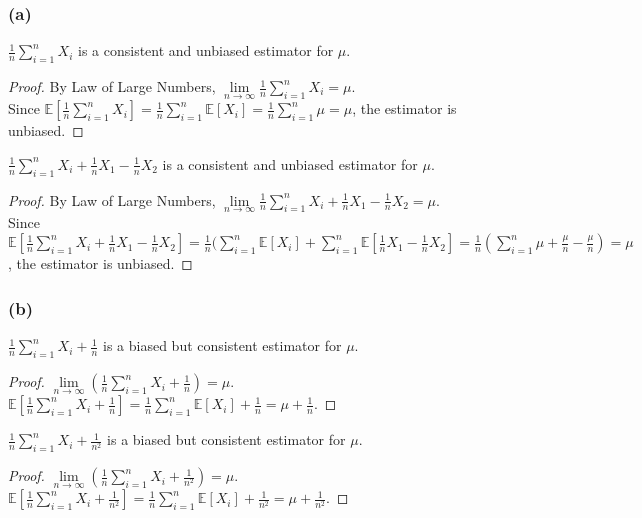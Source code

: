 \documentclass[twoside,11pt]{homework}
\begin{document}
\subsubsection*{(a)}
	\begin{claim}
		$\frac{1}{n} \sum_{i=1}^n X_i $ is a consistent and unbiased estimator for $\mu$.
	\end{claim}
	\begin{proof}
		By Law of Large Numbers, 
		$ \lim\limits_{n\rightarrow \infty} \frac{1}{n} \sum_{i=1}^n X_i = \mu$.\\
		Since $\mathbb{E}[\frac{1}{n} \sum_{i=1}^n X_i]
		=\frac{1}{n} \sum_{i=1}^n \mathbb{E}[X_i]
		=\frac{1}{n} \sum_{i=1}^n \mu
		=\mu
		$, the estimator is unbiased.
	\end{proof}
	\begin{claim}
		$\frac{1}{n} \sum_{i=1}^n X_i + \frac{1}{n} X_1- \frac{1}{n} X_2$ is a consistent and unbiased estimator for $\mu$.
	\end{claim}
	\begin{proof}
		By Law of Large Numbers, 
		$ \lim\limits_{n\rightarrow \infty} \frac{1}{n} \sum_{i=1}^n X_i + \frac{1}{n} X_1- \frac{1}{n} X_2 = \mu$.\\
		Since $\mathbb{E}[\frac{1}{n} \sum_{i=1}^n X_i  + \frac{1}{n} X_1- \frac{1}{n} X_2]
		=\frac{1}{n} (\sum_{i=1}^n \mathbb{E}[X_i] +  \sum_{i=1}^n \mathbb{E}[\frac{1}{n} X_1 - \frac{1}{n} X_2]
		=\frac{1}{n} (\sum_{i=1}^n \mu + \frac{\mu}{n} - \frac{\mu}{n})
		=\mu
		$, the estimator is unbiased.
	\end{proof}

\subsubsection*{(b)}	
	\begin{claim}
		$ \frac{1}{n} \sum_{i=1}^n X_i +\frac{1}{n}$ is a biased but consistent estimator for $\mu$.
	\end{claim}
	\begin{proof}
		$ \lim\limits_{n\rightarrow \infty} (\frac{1}{n} \sum_{i=1}^n X_i +\frac{1}{n})= \mu$.
		$\mathbb{E}[\frac{1}{n} \sum_{i=1}^n X_i +\frac{1}{n}]
		=\frac{1}{n} \sum_{i=1}^n \mathbb{E}[X_i] +\frac{1}{n}
		=\mu+\frac{1}{n}.
		$
	\end{proof}
	\begin{claim}
		$ \frac{1}{n} \sum_{i=1}^n X_i +\frac{1}{n^2}$ is a biased but consistent estimator for $\mu$.
	\end{claim}
	\begin{proof}
		$ \lim\limits_{n\rightarrow \infty} (\frac{1}{n} \sum_{i=1}^n X_i +\frac{1}{n^2	})= \mu$.
		$\mathbb{E}[\frac{1}{n} \sum_{i=1}^n X_i +\frac{1}{n^2}]
		=\frac{1}{n} \sum_{i=1}^n \mathbb{E}[X_i] +\frac{1}{n^2}
		=\mu+\frac{1}{n^2}.
		$
	\end{proof}
\end{document}
